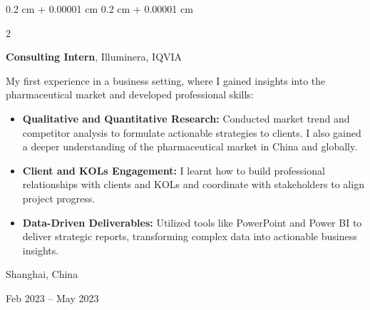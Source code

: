 \documentclass[10pt, letterpaper]{article}
\newenvironment{highlights}{
    \begin{itemize}[
        topsep=0.10 cm,
        parsep=0.10 cm,
        partopsep=0pt,
        itemsep=0pt,
        leftmargin=0.4 cm + 10pt
    ]
}{
    \end{itemize}
} %
\newenvironment{onecolentry}{
    \begin{adjustwidth}{
        0.2 cm + 0.00001 cm
    }{
        0.2 cm + 0.00001 cm
    }
}{
    \end{adjustwidth}
} %
\newenvironment{twocolentry}[2][]{
    \onecolentry
    \def\secondColumn{#2}
    \setcolumnwidth{\fill, 4.5 cm}
    \begin{paracol}{2}
}{
    \switchcolumn \raggedleft \secondColumn
    \end{paracol}
    \endonecolentry
} %
\begin{document}
        \begin{twocolentry}{
    Shanghai, China

    Feb 2023 – May 2023
}
    \textbf{Consulting Intern}, Illuminera, IQVIA

    \vspace{0.1cm}
    
    My first experience in a business setting, where I gained insights into the pharmaceutical market and developed professional skills:
    

    \begin{highlights}
        \item \textbf{Qualitative and Quantitative Research:} Conducted market trend and competitor analysis to formulate actionable strategies to clients. I also gained a deeper understanding of the pharmaceutical market in China and globally.

        \vspace{0.1cm}
        
        \item \textbf{Client and KOLs Engagement:} I learnt how to build professional relationships with clients and KOLs and coordinate with stakeholders to align project progress.

        \vspace{0.1cm}
        
        \item \textbf{Data-Driven Deliverables:} Utilized tools like PowerPoint and Power BI to deliver strategic reports, transforming complex data into actionable business insights.
    \end{highlights}
\end{twocolentry}

        \vspace{0.3 cm}


    

        
\end{document}
